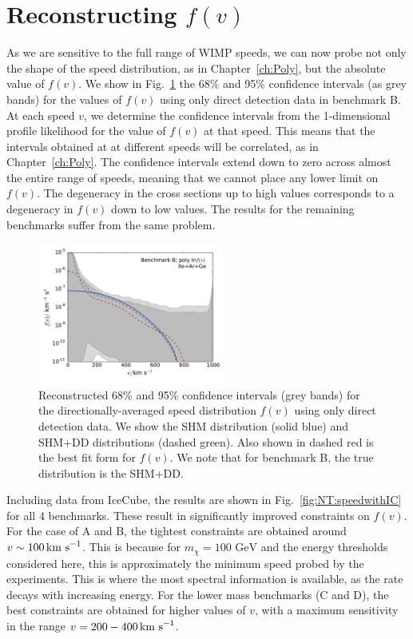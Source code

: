 \section{Reconstructing $f(v)$}
\label{sec:NT:speeddist}

As we are sensitive to the full range of WIMP speeds, we can now probe not only the shape of the speed distribution, as in Chapter~\ref{ch:Poly}, but the absolute value of $f(v)$. We show in Fig.~\ref{fig:NT:speedwithoutIC} the 68\% and 95\% confidence intervals (as grey bands) for the values of $f(v)$ using only direct detection data in benchmark B. At each speed $v$, we determine the confidence intervals from the 1-dimensional profile likelihood for the value of $f(v)$ at that speed. This means that the intervals obtained at at different speeds will be correlated, as in Chapter~\ref{ch:Poly}. The confidence intervals extend down to zero across almost the entire range of speeds, meaning that we cannot place any lower limit on $f(v)$. The degeneracy in the cross sections up to high values corresponds to a degeneracy in $f(v)$ down to low values. The results for the remaining benchmarks suffer from the same problem.

\begin{figure}[!ht]
  \centering
  \includegraphics[trim=0.5cm 0.5cm 0.5cm 0.5cm, clip,width=0.55\textwidth]{NT/BenchmarkB_poly_noIC-speed.pdf}
\caption[Reconstructed $f(v)$ using the polynomial $\ln f(v)$ parametrisation and direct detection data only for benchmark B]{Reconstructed 68\% and 95\% confidence intervals (grey bands) for the directionally-averaged speed distribution $f(v)$ using only direct detection data. We show the SHM distribution (solid blue) and SHM+DD distributions (dashed green). Also shown in dashed red is the best fit form for $f(v)$. We note that for benchmark B, the true distribution is the SHM+DD.}
\label{fig:NT:speedwithoutIC}
\end{figure}

Including data from IceCube, the results are shown in Fig.~\ref{fig:NT:speedwithIC} for all 4 benchmarks. These result in significantly improved constraints on $f(v)$. For the case of A and B, the tightest constraints are obtained around $v \sim 100 \,\textrm{km s}^{-1}$. This is because for $m_\chi = 100 \textrm{ GeV}$ and the energy thresholds considered here, this is approximately the minimum speed probed by the experiments. This is where the most spectral information is available, as the rate decays with increasing energy. For the lower mass benchmarks (C and D), the best constraints are obtained for higher values of $v$, with a maximum sensitivity in the range $v=200-400 \,\textrm{km s}^{-1}$.

